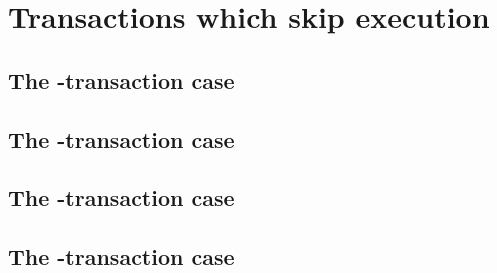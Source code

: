 
\section{Transactions which skip \evm{} execution \lispTodo{}}
\subsection{The \sysi{}-transaction                     case} \label{hub: tx skip: sysi} 
\subsection{The \user{}-transaction                     case} \label{hub: tx skip: user} 
\subsection{The \sysf{}-transaction                     case} \label{hub: tx skip: sysf} 
\subsection{The \txnSystemTransactionNoop{}-transaction case} \label{hub: tx skip: sysi} 
